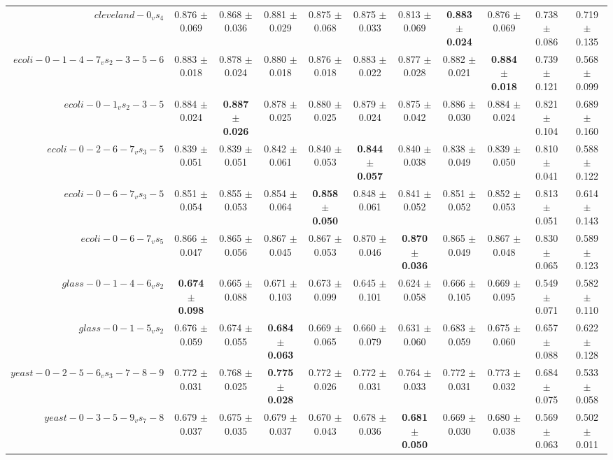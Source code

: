 \begin{table}[!ht]
{\begin{tabular}{r c c c c c c c c c c}
$cleveland-0_vs_4$ & 0.876 $\pm$ 0.069 & 0.868 $\pm$ 0.036 & 0.881 $\pm$ 0.029 & 0.875 $\pm$ 0.068 & 0.875 $\pm$ 0.033 & 0.813 $\pm$ 0.069 & \textbf{0.883 $\pm$ 0.024} & 0.876 $\pm$ 0.069 & 0.738 $\pm$ 0.086 & 0.719 $\pm$ 0.135 \\
$ecoli-0-1-4-7_vs_2-3-5-6$ & 0.883 $\pm$ 0.018 & 0.878 $\pm$ 0.024 & 0.880 $\pm$ 0.018 & 0.876 $\pm$ 0.018 & 0.883 $\pm$ 0.022 & 0.877 $\pm$ 0.028 & 0.882 $\pm$ 0.021 & \textbf{0.884 $\pm$ 0.018} & 0.739 $\pm$ 0.121 & 0.568 $\pm$ 0.099 \\
$ecoli-0-1_vs_2-3-5$ & 0.884 $\pm$ 0.024 & \textbf{0.887 $\pm$ 0.026} & 0.878 $\pm$ 0.025 & 0.880 $\pm$ 0.025 & 0.879 $\pm$ 0.024 & 0.875 $\pm$ 0.042 & 0.886 $\pm$ 0.030 & 0.884 $\pm$ 0.024 & 0.821 $\pm$ 0.104 & 0.689 $\pm$ 0.160 \\
$ecoli-0-2-6-7_vs_3-5$ & 0.839 $\pm$ 0.051 & 0.839 $\pm$ 0.051 & 0.842 $\pm$ 0.061 & 0.840 $\pm$ 0.053 & \textbf{0.844 $\pm$ 0.057} & 0.840 $\pm$ 0.038 & 0.838 $\pm$ 0.049 & 0.839 $\pm$ 0.050 & 0.810 $\pm$ 0.041 & 0.588 $\pm$ 0.122 \\
$ecoli-0-6-7_vs_3-5$ & 0.851 $\pm$ 0.054 & 0.855 $\pm$ 0.053 & 0.854 $\pm$ 0.064 & \textbf{0.858 $\pm$ 0.050} & 0.848 $\pm$ 0.061 & 0.841 $\pm$ 0.052 & 0.851 $\pm$ 0.052 & 0.852 $\pm$ 0.053 & 0.813 $\pm$ 0.051 & 0.614 $\pm$ 0.143 \\
$ecoli-0-6-7_vs_5$ & 0.866 $\pm$ 0.047 & 0.865 $\pm$ 0.056 & 0.867 $\pm$ 0.045 & 0.867 $\pm$ 0.053 & 0.870 $\pm$ 0.046 & \textbf{0.870 $\pm$ 0.036} & 0.865 $\pm$ 0.049 & 0.867 $\pm$ 0.048 & 0.830 $\pm$ 0.065 & 0.589 $\pm$ 0.123 \\
$glass-0-1-4-6_vs_2$ & \textbf{0.674 $\pm$ 0.098} & 0.665 $\pm$ 0.088 & 0.671 $\pm$ 0.103 & 0.673 $\pm$ 0.099 & 0.645 $\pm$ 0.101 & 0.624 $\pm$ 0.058 & 0.666 $\pm$ 0.105 & 0.669 $\pm$ 0.095 & 0.549 $\pm$ 0.071 & 0.582 $\pm$ 0.110 \\
$glass-0-1-5_vs_2$ & 0.676 $\pm$ 0.059 & 0.674 $\pm$ 0.055 & \textbf{0.684 $\pm$ 0.063} & 0.669 $\pm$ 0.065 & 0.660 $\pm$ 0.079 & 0.631 $\pm$ 0.060 & 0.683 $\pm$ 0.059 & 0.675 $\pm$ 0.060 & 0.657 $\pm$ 0.088 & 0.622 $\pm$ 0.128 \\
$yeast-0-2-5-6_vs_3-7-8-9$ & 0.772 $\pm$ 0.031 & 0.768 $\pm$ 0.025 & \textbf{0.775 $\pm$ 0.028} & 0.772 $\pm$ 0.026 & 0.772 $\pm$ 0.031 & 0.764 $\pm$ 0.033 & 0.772 $\pm$ 0.031 & 0.773 $\pm$ 0.032 & 0.684 $\pm$ 0.075 & 0.533 $\pm$ 0.058 \\
$yeast-0-3-5-9_vs_7-8$ & 0.679 $\pm$ 0.037 & 0.675 $\pm$ 0.035 & 0.679 $\pm$ 0.037 & 0.670 $\pm$ 0.043 & 0.678 $\pm$ 0.036 & \textbf{0.681 $\pm$ 0.050} & 0.669 $\pm$ 0.030 & 0.680 $\pm$ 0.038 & 0.569 $\pm$ 0.063 & 0.502 $\pm$ 0.011 \\

\end{tabular}}
\end{table}
